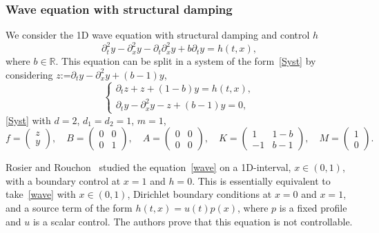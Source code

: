 \documentclass[10pt]{amsart}
\theoremstyle{plain}
\theoremstyle{definition}
\theoremstyle{remark}
\newcommand{\set}{\mathbb}
\newcommand{\R}{} %
\renewcommand{\R}{\set{R}}
\newcommand{\coloneqq}{\mathrel{\mathord{:}\mathord=}}
\begin{document}
\subsubsection{Wave equation with structural damping}
We consider the 1D wave equation with structural damping and control $h$\vspace*{-3pt}\enlargethispage{\baselineskip}%
\begin{equation} \label{wave}
\partial_t^2 y - \partial_x^2 y -\partial_t\partial_x^2y + b \partial_t y = h(t,x),
\end{equation}
where $b\in\R$. This equation can be split in a system of the form~\eqref{Syst} by considering $z\coloneqq \partial_t y - \partial_x^2 y+(b-1)y$,\vspace*{-3pt}
\begin{equation} \label{wave_syst}
\begin{cases}
\partial_t z+z+(1-b)y= h(t,x), \\
\partial_t y-\partial_x^2 y -z + (b-1)y =0,
\end{cases}
\end{equation}
\ie \eqref{Syst} with $d=2$, $d_1=d_2=1$, $m=1$,\vspace*{-3pt}
\begin{equation} \label{wave_matrix}
f=\begin{pmatrix}
z \\ y
\end{pmatrix}, \quad
B=\begin{pmatrix}
0 & 0 \\ 0 & 1
\end{pmatrix}, \quad
A=\begin{pmatrix}
0 & 0 \\ 0 & 0
\end{pmatrix}, \quad
K=\begin{pmatrix}
1 & 1-b \\ -1 & b-1
\end{pmatrix}, \quad
M=\begin{pmatrix}
1 \\ 0
\end{pmatrix}.
\end{equation}

Rosier and Rouchon~\cite{rosier_2007} studied the equation~\eqref{wave} on a 1D-interval, $x\in (0,1)$, with a boundary control at $x=1$ and $h=0$. This is essentially equivalent to take~\eqref{wave} with $x\in(0,1)$, Dirichlet boundary conditions at $x=0$ and $x=1$, and a source term of the form $h(t,x)=u(t)p(x)$, where $p$ is a fixed profile and $u$ is a scalar control. The authors prove that this equation is not controllable.
\end{document}
